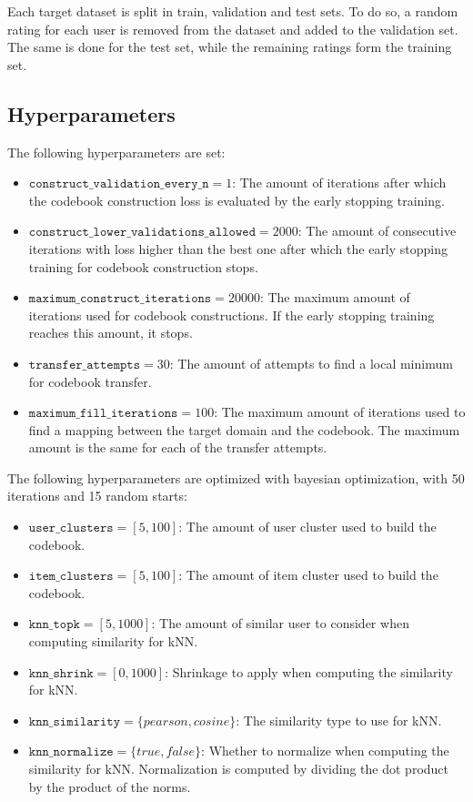 Each target dataset is split in train, validation and test sets. To do so, a random rating for each user is removed from the dataset and added to the validation set. The same is done for the test set, while the remaining ratings form the training set.


\subsection{Hyperparameters}

The following hyperparameters are set:
\begin{itemize}
\item $\texttt{construct\_validation\_every\_n} = 1$: The amount of iterations after which the codebook construction loss is evaluated by the early stopping training.
\item $\texttt{construct\_lower\_validations\_allowed} = 2000$: The amount of consecutive iterations with loss higher than the best one after which the early stopping training for codebook construction stops.
\item $\texttt{maximum\_construct\_iterations} = 20000$: The maximum amount of iterations used for codebook constructions. If the early stopping training reaches this amount, it stops.
\item $\texttt{transfer\_attempts} = 30$: The amount of attempts to find a local minimum for codebook transfer.
\item $\texttt{maximum\_fill\_iterations} = 100$: The maximum amount of iterations used to find a mapping between the target domain and the codebook. The maximum amount is the same for each of the transfer attempts.
\end{itemize}
The following hyperparameters are optimized with bayesian optimization, with 50 iterations and 15 random starts:
\begin{itemize}
\item $\texttt{user\_clusters} = [5,100]$: The amount of user cluster used to build the codebook.
\item $\texttt{item\_clusters} = [5,100]$: The amount of item cluster used to build the codebook.
\item $\texttt{knn\_topk} = [5,1000]$: The amount of similar user to consider when computing similarity for kNN.
\item $\texttt{knn\_shrink} = [0,1000]$: Shrinkage to apply when computing the similarity for kNN.
\item $\texttt{knn\_similarity} = \{pearson,cosine\}$: The similarity type to use for kNN.
\item $\texttt{knn\_normalize} = \{true,false\}$: Whether to normalize when computing the similarity for kNN. Normalization is computed by dividing the dot product by the product of the norms.
\end{itemize}


